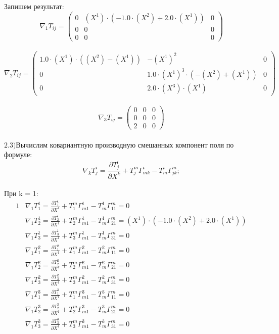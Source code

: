 \documentclass[a4paper, 12pt, oneside]{article}
\begin{document}
Запишем результат:\\
\[
\nabla_1T_{ij} = \begin{pmatrix}
	0 & (X^1)\cdot (-1.0\cdot (X^2) + 2.0\cdot (X^1)) & 0\\
	0 & 0 & 0\\
	0 & 0 & 0
\end{pmatrix}
\]\\
\[
\nabla_2T_{ij} = \begin{pmatrix}
	1.0\cdot (X^1)\cdot ((X^2) - (X^1)) & -(X^1)^2 & 0\\
	0 & 1.0\cdot (X^1)^3\cdot (-(X^2) + (X^1)) & 0\\
	0 & 2.0\cdot (X^3)\cdot (X^1) & 0
\end{pmatrix}
\]\\
\[
\nabla_3T_{ij} = \begin{pmatrix}
	0 & 0 & 0\\
	0 & 0 & 0\\
	2 & 0 & 0
\end{pmatrix}
\]\\
$\mathrm{2.3) }$Вычислим ковариантную производную смешанных компонент поля по формуле:\\
\[
\nabla_kT^i_j = \frac{\partial T^i_j}{\partial X^k} + T^m_j\Gamma^i_{mk} - T^i_m\Gamma^m_{jk};
\]\\
При k = 1:\\
\begin{alignat*}{1}
  & \nabla_1T^1_1 = \frac{\partial T^1_1}{\partial X^1} + T^m_1\Gamma^1_{m1} - T^1_m\Gamma^m_{11} = 0 \\
  & \nabla_1T^1_2 = \frac{\partial T^1_2}{\partial X^1} + T^m_2\Gamma^1_{m1} - T^1_m\Gamma^m_{21} = (X^1)\cdot (-1.0\cdot (X^2) + 2.0\cdot (X^1)) \\
  & \nabla_1T^1_3 = \frac{\partial T^1_3}{\partial X^1} + T^m_3\Gamma^1_{m1} - T^1_m\Gamma^m_{31} = 0 \\
  & \nabla_1T^2_1 = \frac{\partial T^2_1}{\partial X^1} + T^m_1\Gamma^2_{m1} - T^2_m\Gamma^m_{11} = 0 \\
  & \nabla_1T^2_2 = \frac{\partial T^2_2}{\partial X^1} + T^m_2\Gamma^2_{m1} - T^2_m\Gamma^m_{21} = 0 \\
  & \nabla_1T^2_3 = \frac{\partial T^2_3}{\partial X^1} + T^m_3\Gamma^2_{m1} - T^2_m\Gamma^m_{31} = 0 \\
  & \nabla_1T^3_1 = \frac{\partial T^3_1}{\partial X^1} + T^m_1\Gamma^3_{m1} - T^3_m\Gamma^m_{11} = 0 \\
  & \nabla_1T^3_2 = \frac{\partial T^3_2}{\partial X^1} + T^m_2\Gamma^3_{m1} - T^3_m\Gamma^m_{21} = 0 \\
  & \nabla_1T^3_3 = \frac{\partial T^3_3}{\partial X^1} + T^m_3\Gamma^3_{m1} - T^3_m\Gamma^m_{31} = 0 
\end{alignat*}\\
\end{document}
